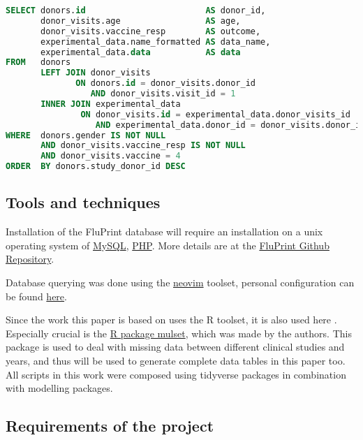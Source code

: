 \begin{lstlisting}[language=sql, caption=Query of initial SIMON data, label={lst:QueryTemplate}]
SELECT donors.id                        AS donor_id,
       donor_visits.age                 AS age,
       donor_visits.vaccine_resp        AS outcome,
       experimental_data.name_formatted AS data_name,
       experimental_data.data           AS data
FROM   donors
       LEFT JOIN donor_visits
              ON donors.id = donor_visits.donor_id
                 AND donor_visits.visit_id = 1
       INNER JOIN experimental_data
               ON donor_visits.id = experimental_data.donor_visits_id
                  AND experimental_data.donor_id = donor_visits.donor_id
WHERE  donors.gender IS NOT NULL
       AND donor_visits.vaccine_resp IS NOT NULL
       AND donor_visits.vaccine = 4
ORDER  BY donors.study_donor_id DESC
\end{lstlisting}

\subsection{Tools and techniques}

Installation of the FluPrint database will require an installation on a
unix operating system of \href{https://www.mysql.com/}{MySQL},
\href{https://www.php.net/manual/en/install.php}{PHP}. More details are at the
\href{https://github.com/LogIN-/fluprint}{FluPrint Github Repository}.

Database querying was done using the \href{https://neovim.io/}{neovim} toolset,
personal configuration can be found
\href{https://github.com/Vinkage/mike_neovim/tree/feature}{here}.

Since the work this paper is based on uses the R toolset, it is also used here
\citep{tomicFluPRINTDatasetMultidimensional2019,
tomicSIMONAutomatedMachine2019}.  Especially crucial is the
\href{https://cran.r-project.org/web/packages/mulset/index.html}{R package
mulset}, which was made by the authors. This package is used to deal with
missing data between different clinical studies and years, and thus will be
used to generate complete data tables in this paper too. All scripts in this
work were composed using tidyverse packages in combination with modelling
packages.

\subsection{Requirements of the project}

